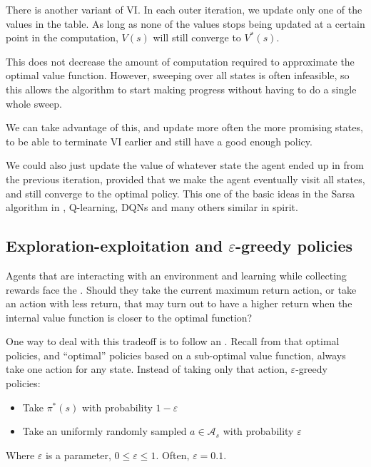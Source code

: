 \citep[Section~4.4]{sutton1998introduction}

There is another variant of \acl{VI}. In each outer iteration, we update only
one of the values in the table. As long as none of the values stops being
updated at a certain point in the computation, $V(s)$ will still converge to $V^*(s)$.

This does not decrease the amount of computation required to approximate the
optimal value function. However, sweeping over all states is often infeasible,
so this allows the algorithm to start making progress without having to do a
single whole sweep.

We can take advantage of this, and update more often the more promising states,
to be able to terminate \acl{VI} earlier and still have a good enough policy.
\citep[Section~4.5]{sutton1998introduction}

 We could also just update the value of whatever state the agent ended up in
from the previous iteration, provided that we make the agent eventually visit
all states, and still converge to the optimal policy. This one of the basic
ideas in the Sarsa algorithm in , Q-learning,
\aclp{DQN} and many others similar in spirit.

\subsection{Exploration-exploitation and \texorpdfstring{$\varepsilon$}{ε}-greedy policies}
Agents that are interacting with an environment and learning while collecting
rewards face the . Should they take the
current maximum return action, or take an action with less return, that may turn
out to have a higher return when the internal value function is closer to the
optimal function?

One way to deal with this tradeoff is to follow an
.
Recall from  that optimal policies,
and ``optimal'' policies based on a sub-optimal value function, always take one
action for any state. Instead of taking only that action, $\varepsilon$-greedy
policies:
\begin{itemize}
\item Take $\pi^*(s)$ with probability $1-\varepsilon$
\item Take an uniformly randomly sampled $a\in\mathcal{A}_s$ with probability
$\varepsilon$
\end{itemize}
Where $\varepsilon$ is a parameter, $0\leq\varepsilon\leq 1$. Often,
$\varepsilon=0.1$.

